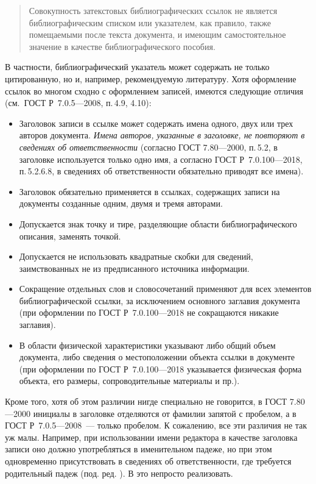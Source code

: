 \documentclass[10pt,a4paper,headings=small,numbers=enddot,english,russian]{ltxdockit}
\newcommand*{\gostbibname}[1][]{ГОСТ#1 Р~7.0.100---2018\xspace}
\newcommand*{\gostcitename}[1][]{ГОСТ#1 Р~7.0.5---2008\xspace}
\newcommand*{\gostheadname}[1][]{ГОСТ#1 7.80---2000\xspace}
\newcommand*{\gostbibref}[2][]{\gostbibname[#1], п.\,#2\xspace}
\newcommand*{\gostciteref}[2][]{\gostcitename[#1], п.\,#2\xspace}
\newcommand*{\gostheadref}[2][]{\gostheadname[#1], п.\,#2\xspace}
\begin{document}
\begin{quotation}
Совокупность затекстовых библиографических ссылок не является библиографическим списком или
  указателем, как правило, также помещаемыми после текста документа, и имеющим самостоятельное
  значение в качестве библиографического пособия.
\end{quotation}
В частности, библиографический указатель может содержать не только цитированную, но и, например,
  рекомендуемую литературу.
Хотя оформление ссылок во многом сходно с оформлением записей, имеются следующие отличия
  (см.~\gostciteref{}{4.9, 4.10}):
\begin{itemize}
  \item Заголовок записи в ссылке может содержать имена одного, двух или трех авторов документа.
    \emph{Имена авторов, указанные в заголовке, не повторяют в сведениях об ответственности}
    (согласно \gostheadref{}{5.2}, в заголовке используется только одно имя,
    а согласно \gostbibref{5.2.6.8},
    в сведениях об ответственности обязательно приводят все имена).
  \item Заголовок обязательно применяется в ссылках, содержащих записи на документы созданные
    одним, двумя и тремя авторами.
  \item Допускается знак точку и тире, разделяющие области библиографического описания, заменять
    точкой.
  \item Допускается не использовать квадратные скобки для сведений, заимствованных не из
    предписанного источника информации.
  \item Сокращение отдельных слов и словосочетаний применяют для всех элементов библиографической
    ссылки, за исключением основного заглавия документа
    (при оформлении по \gostbibname не сокращаются никакие заглавия).
  \item В области физической характеристики указывают либо общий объем документа, либо сведения о
    местоположении объекта ссылки в документе (при оформлении по \gostbibname указывается
    физическая форма объекта, его размеры, сопроводительные материалы и пр.).
\end{itemize}

Кроме того, хотя об этом различии нигде специально не говорится,
  в \gostheadname инициалы в заголовке отделяются от фамилии запятой с пробелом, а в
  \gostcitename~--- только пробелом.
К сожалению, все эти различия не так уж малы.
Например, при использовании имени редактора в качестве заголовка записи оно должно употребляться
  в именительном падеже, но при этом одновременно присутствовать в сведениях
  об ответственности, где требуется родительный падеж (под. ред. \textellipsis).
В \latex это непросто реализовать.
\end{document}
